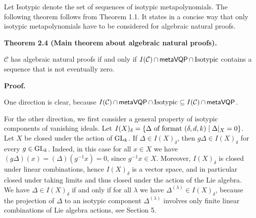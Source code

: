 Let Isotypic denote the set of sequences of isotypic metapolynomials.
The following theorem follows from Theorem 1.1. It states in a concise way that only isotypic metapolynomials have to be considered for algebraic natural proofs.





\par\medskip\noindent\textbf{Theorem 2.4 (Main theorem about algebraic natural proofs).}\par



$\mathcal{C}$ has algebraic natural proofs if and only if $I(\mathcal{C})\mathop{\cap}\mathsf{metaVQP}\mathop{\cap}\textup{{Isotypic}}$ contains a sequence that is not eventually zero.






\par\medskip\noindent\textbf{Proof.}\par




One direction is clear, because $I(\mathcal{C})\mathop{\cap}\mathsf{metaVQP}\mathop{\cap}\textup{{Isotypic}}\subseteq I(\mathcal{C})\mathop{\cap}\mathsf{metaVQP}$.





For the other direction, we first consider a general property of isotypic components of vanishing ideals.
Let $I(X)_{\delta}=\{\Delta\textup{ of format $(\delta,d,k)$}\mid\Delta|_{X}=0\}$.
Let $X$ be closed under the action of $\textnormal{GL}_{k}$.
If $\Delta\in I(X)_{\delta}$, then $g\Delta\in I(X)_{\delta}$ for every $g\in\textnormal{GL}_{k}$.
Indeed, in this case for all $x\in X$ we have $(g\Delta)(x)=(\Delta)(g^{-1}x)=0$, since $g^{-1}x\in X$.
Moreover, $I(X)_{\delta}$ is closed under linear combinations, hence $I(X)_{\delta}$ is a vector space, and in particular closed under taking limits and thus closed under the action of the Lie algebra.
We have $\Delta\in I(X)_{\delta}$ if and only if for all $\lambda$ we have $\Delta^{(\lambda)}\in I(X)_{\delta}$, because the projection of $\Delta$ to an isotypic component $\Delta^{(\lambda)}$ involves only finite linear combinations of Lie algebra actions, see Section 5.





